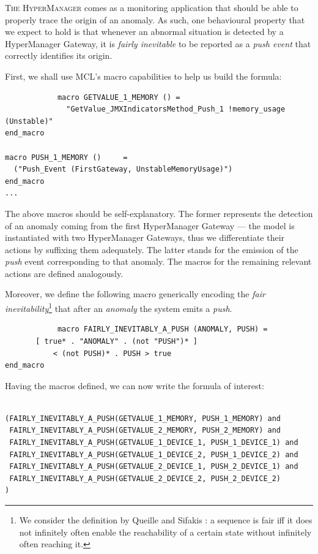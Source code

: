 		
		\textsc{The HyperManager} comes as a monitoring application that should be able to properly
		trace the origin of an anomaly. As such, one behavioural property that we expect to hold is that
		whenever an abnormal situation is detected by a \textsf{HyperManager Gateway}, it is \textit{fairly inevitable} 
		to be reported as a \textit{push event} that correctly identifies its origin. 
		
		First, we shall use \ac{MCL}'s macro capabilities to help us build the formula:
		

		\begin{verbatim}
			macro GETVALUE_1_MEMORY () = 
			  "GetValue_JMXIndicatorsMethod_Push_1 !memory_usage (Unstable)" 
end_macro

macro PUSH_1_MEMORY ()     = 
  ("Push_Event (FirstGateway, UnstableMemoryUsage)")  
end_macro
...
		\end{verbatim} 

		
		\noindent The above macros should be self-explanatory. The former represents the detection of an anomaly
		coming from the first \textsf{HyperManager Gateway} --- the model is instantiated with two \textsf{HyperManager Gateway}s,
		thus we differentiate  their actions by suffixing them adequately. The latter stands for the emission
		of the \textit{push} event corresponding to that anomaly. The macros for the remaining
		relevant actions are defined analogously.
		
			Moreover, we define the following macro generically encoding the 
			\textit{fair inevitability}\footnote{We consider the definition by 
			Queille and Sifakis \cite{journals/acta/QueilleS83}: a sequence is fair iff it does not infinitely often 
			enable the reachability of a certain state without infinitely often reaching it.} that
			after an \textit{anomaly} the system emits a \textit{push}.
			
		\begin{verbatim}
			macro FAIRLY_INEVITABLY_A_PUSH (ANOMALY, PUSH) =
       [ true* . "ANOMALY" . (not "PUSH")* ]
           < (not PUSH)* . PUSH > true
end_macro
		\end{verbatim}		
		
		
		\noindent Having the macros defined, we can now write the formula of interest:


		\begin{property} 
		\label{prop:fair1}
			\begin{verbatim}	
			
(FAIRLY_INEVITABLY_A_PUSH(GETVALUE_1_MEMORY, PUSH_1_MEMORY) and
 FAIRLY_INEVITABLY_A_PUSH(GETVALUE_2_MEMORY, PUSH_2_MEMORY) and
 FAIRLY_INEVITABLY_A_PUSH(GETVALUE_1_DEVICE_1, PUSH_1_DEVICE_1) and
 FAIRLY_INEVITABLY_A_PUSH(GETVALUE_1_DEVICE_2, PUSH_1_DEVICE_2) and
 FAIRLY_INEVITABLY_A_PUSH(GETVALUE_2_DEVICE_1, PUSH_2_DEVICE_1) and
 FAIRLY_INEVITABLY_A_PUSH(GETVALUE_2_DEVICE_2, PUSH_2_DEVICE_2)
)\end{verbatim}
\end{property}		

